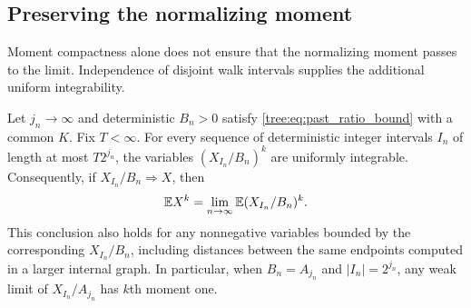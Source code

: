 \subsection{Preserving the normalizing moment}

Moment compactness alone does not ensure that the normalizing moment
passes to the limit. Independence of disjoint walk intervals supplies
the additional uniform integrability.

\begin{lemma}
\label{tree:lem:moment_ui}
Let $j_n\to\infty$ and deterministic $B_n>0$ satisfy
\eqref{tree:eq:past_ratio_bound} with a common $K$. Fix $T<\infty$.
For every sequence of deterministic integer intervals $I_n$ of length at most
$T2^{j_n}$, the variables $(X_{I_n}/B_n)^k$ are uniformly
integrable. Consequently, if
$X_{I_n}/B_n\Rightarrow X$, then
\begin{equation}\label{tree:eq:moment_convergence}
 \mathbb E X^k=\lim_{n\to\infty}\mathbb E(X_{I_n}/B_n)^k.
\end{equation}
This conclusion also holds for any nonnegative variables bounded
by the corresponding $X_{I_n}/B_n$, including distances between
the same endpoints computed in a larger internal graph. In
particular, when $B_n=A_{j_n}$ and $|I_n|=2^{j_n}$, any weak
limit of $X_{I_n}/A_{j_n}$ has $k$th moment one.
\end{lemma}

